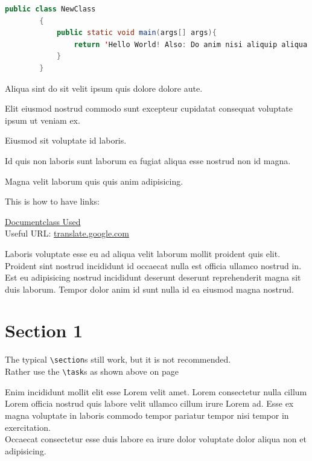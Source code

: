 \documentclass
    [   %
        repeatauthor,           %
        a4paper                 %
    ]{uhhassignment}
\begin{document}
\begin{minipage}{\textwidth}
    \begin{lstlisting}[language = Java, firstnumber = last]
        public class NewClass 
        {
            public static void main(args[] args){
                return 'Hello World! Also: Do anim nisi aliquip aliqua aliqua fugiat nostrud occaecat ex dolore sit. Cupidatat exercitation ipsum velit magna qui ea aliquip reprehenderit.';
            }
        }
    \end{lstlisting}
\end{minipage}

Aliqua sint do sit velit ipsum quis dolore dolore aute.

Elit eiusmod nostrud commodo sunt excepteur cupidatat consequat voluptate ipsum ut veniam ex.

Eiusmod sit voluptate id laboris.

Id quis non laboris sunt laborum ea fugiat aliqua esse nostrud non id magna.

Magna velit laborum quis quis anim adipisicing. 

This is how to have links:

\href{https://ftp.cc.uoc.gr/mirrors/CTAN/macros/latex/contrib/uhhassignment/uhhassignment.pdf}{Documentclass Used}\\
Useful URL: \url{translate.google.com}\\

Laboris voluptate esse eu ad aliqua velit laborum mollit proident quis elit.\\
Proident sint nostrud incididunt id occaecat nulla est officia ullamco nostrud in. 
Est eu adipisicing nostrud incididunt deserunt deserunt reprehenderit magna sit duis laborum. 
Tempor dolor anim id sunt nulla id ea eiusmod magna nostrud.





\newpage
\section{Section 1}
The typical \texttt{\textbackslash section}s still work, but it is not recommended.\\
Rather use the \texttt{\textbackslash task}s as shown above on page \pageref{tsk: Task1}

Enim incididunt mollit elit esse Lorem velit amet. 
Lorem consectetur nulla cillum Lorem officia nostrud quis labore velit ullamco cillum irure Lorem ad. 
Esse ex magna voluptate in laboris commodo tempor pariatur tempor nisi tempor in exercitation.\\
Occaecat consectetur esse duis labore ea irure dolor voluptate dolor aliqua non et adipisicing.
\end{document}
